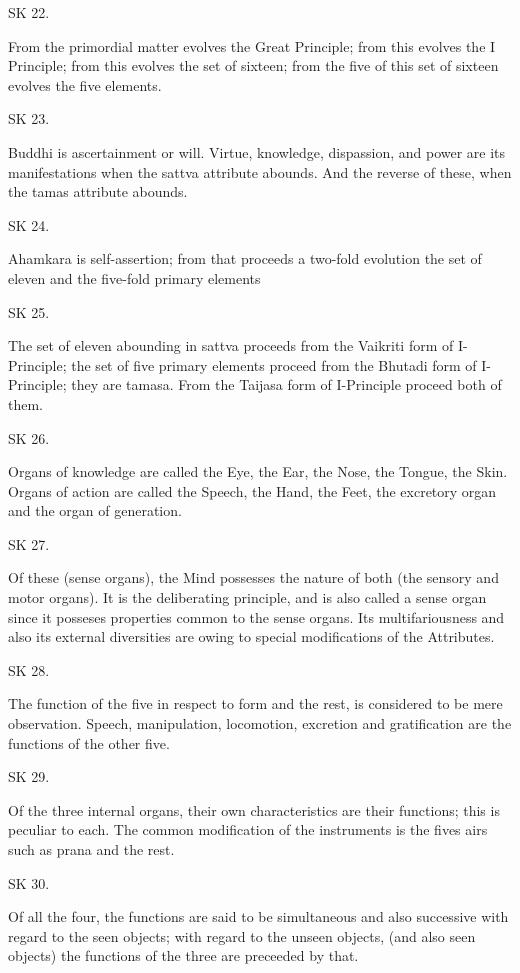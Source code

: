 
SK 22.

From the primordial matter evolves the Great Principle;
from this evolves the I Principle;
from this evolves the set of sixteen;
from the five of this set of sixteen evolves the five elements.

SK 23.

Buddhi is ascertainment or will.
Virtue, knowledge, dispassion, and power are its manifestations
when the sattva attribute abounds.
And the reverse of these, when the tamas attribute abounds.

SK 24.

Ahamkara is self-assertion;
from that proceeds a two-fold evolution
the set of eleven and the five-fold primary elements

SK 25.

The set of eleven abounding in sattva proceeds from the Vaikriti form of I-Principle;
the set of five primary elements proceed from the Bhutadi form of I-Principle;
they are tamasa.
From the Taijasa form of I-Principle proceed both of them.

SK 26.

Organs of knowledge are called the Eye, the Ear, the Nose, the Tongue, the Skin.
Organs of action are called the Speech, the Hand, the Feet, the excretory organ and the organ of generation.

SK 27.

Of these (sense organs), the Mind possesses the nature of both
(the sensory and motor organs).
It is the deliberating principle, and is also called a sense organ
since it posseses properties common to the sense organs.
Its multifariousness and also its external diversities are owing
to special modifications of the Attributes.

SK 28.

The function of the five in respect to form and the rest,
is considered to be mere observation.
Speech, manipulation, locomotion, excretion and gratification
are the functions of the other five.

SK 29.

Of the three internal organs, their own characteristics are their functions;
this is peculiar to each.
The common modification of the instruments is the fives airs
such as prana and the rest.

SK 30.

Of all the four, the functions are said to be simultaneous and also successive
with regard to the seen objects;
with regard to the unseen objects, (and also seen objects)
the functions of the three are preceeded by that.

